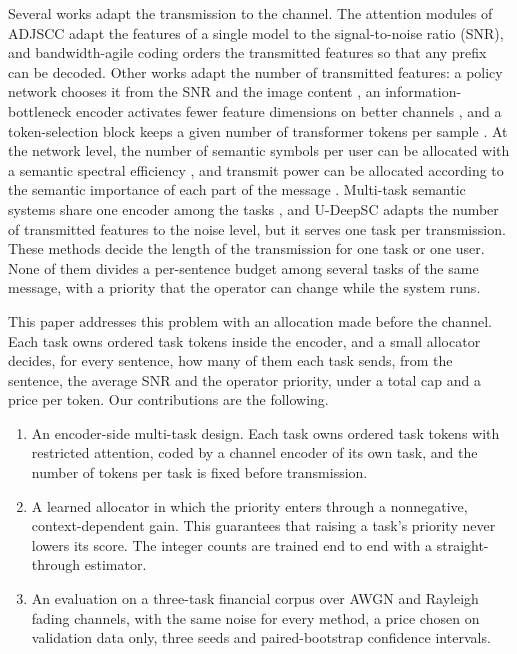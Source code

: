 \documentclass[conference]{IEEEtran}
\begin{document}
Several works adapt the transmission to the channel. The attention
modules of ADJSCC \cite{xu2022adjscc} adapt the features of a single
model to the signal-to-noise ratio (SNR), and bandwidth-agile coding
\cite{kurka2021bandwidth} orders the transmitted features so that any
prefix can be decoded. Other works adapt the number of transmitted
features: a policy network chooses it from the SNR and the image
content \cite{yang2022adaptive}, an information-bottleneck encoder
activates fewer feature dimensions on better channels
\cite{shao2022learning}, and a token-selection block keeps a given
number of transformer tokens per sample \cite{devoto2024adaptive}. At
the network level, the number of semantic symbols per user can be
allocated with a semantic spectral efficiency \cite{yan2022resource},
and transmit power can be allocated according to the semantic
importance of each part of the message \cite{guo2023importance}.
Multi-task semantic systems share one encoder among the tasks
\cite{sheng2024multitask, zhang2024udeepsc}, and U-DeepSC
\cite{zhang2024udeepsc} adapts the number of transmitted features to
the noise level, but it serves one task per transmission. These methods
decide the length of the transmission for one task or one user. None
of them divides a per-sentence budget among several tasks of the same
message, with a priority that the operator can change while the system
runs.

This paper addresses this problem with an allocation made before the
channel. Each task owns ordered task tokens inside the encoder, and a
small allocator decides, for every sentence, how many of them each task
sends, from the sentence, the average SNR and the operator priority,
under a total cap and a price per token. Our contributions are the following.

\begin{enumerate}
  \item An encoder-side multi-task design. Each task owns ordered task
        tokens with restricted attention, coded by a channel encoder of
        its own task, and the number of tokens per task is fixed before
        transmission.
  \item A learned allocator in which the priority enters through a
        nonnegative, context-dependent gain. This guarantees that
        raising a task's priority never lowers its score. The integer
        counts are trained end to end with a straight-through
        estimator.
  \item An evaluation on a three-task financial corpus over AWGN and
        Rayleigh fading channels, with the same noise for every method,
        a price chosen on validation data only, three seeds and
        paired-bootstrap confidence intervals.
\end{enumerate}
\end{document}
